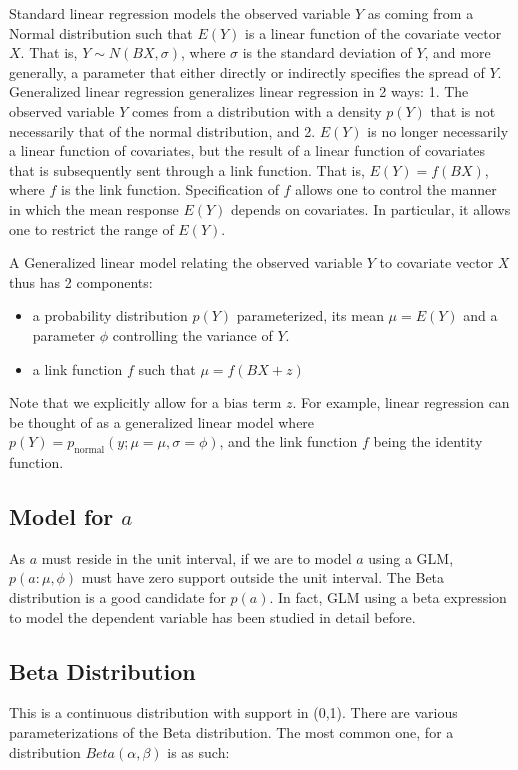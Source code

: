 Standard linear regression models the observed variable $Y$ as coming from a Normal distribution such that $E(Y)$ is a linear function of the covariate vector $X$.  That is, $Y \sim N(BX, \sigma)$, where $\sigma$ is the standard deviation of $Y$, and more generally, a parameter that either directly or indirectly specifies the spread of $Y$.   Generalized linear regression generalizes linear regression in 2 ways: 1. The observed variable $Y$  comes from a distribution with a density $p(Y)$ that is not necessarily that of the normal distribution, and 2. $E(Y)$ is no longer necessarily a linear function of covariates, but the result of a linear function of covariates that is subsequently sent through a link function.  That is, $E(Y) = f(BX)$, where $f$ is the link function.  Specification of $f$ allows one to control the manner in which the mean response $E(Y)$ depends on covariates.  In particular, it allows one to restrict the range of $E(Y)$. 

A Generalized linear model relating the observed variable $Y$ to covariate vector $X$ thus has 2 components:
\begin{itemize}
  \item a probability distribution $p(Y)$ parameterized, its mean $\mu=E(Y)$ and a parameter $\phi$ controlling the variance of $Y$.
  \item a link function $f$ such that $\mu = f(BX+z)$
\end{itemize}

Note that we explicitly allow for a bias term $z$.  For example, linear regression can be thought of as a generalized linear model where $p(Y) = p_{\textrm{normal}}(y;\mu=\mu,\sigma=\phi)$, and the link function $f$ being the identity function.  

\subsection{Model for $a$}

As $a$ must reside in the unit interval, if we are to model $a$ using a GLM, $p(a:\mu,\phi)$ must have zero support outside the unit interval.  The Beta distribution is a good candidate for $p(a)$.  In fact, GLM using a beta expression to model the dependent variable has been studied in detail before\cite{smithson}.  

\subsection{Beta Distribution}
This is a continuous distribution with support in (0,1).  There are various parameterizations of the Beta distribution.  The most common one, for a distribution $Beta(\alpha,\beta)$ is as such:

